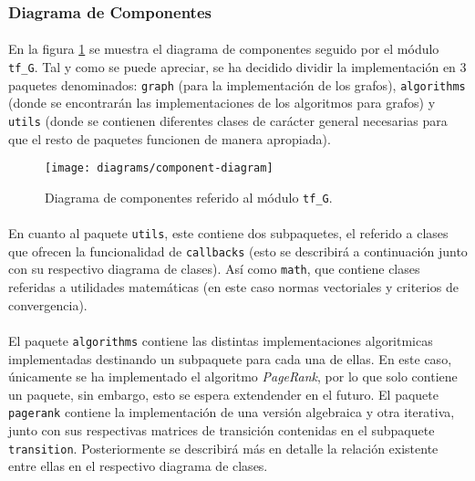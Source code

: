 \documentclass{subfiles}
\begin{document}
        \subsubsection{Diagrama de Componentes}
        \label{sec:component_diagram}

          \paragraph{}
          En la figura \ref{img:component_diagram} se muestra el diagrama de componentes seguido por el módulo \texttt{tf\_G}. Tal y como se puede apreciar, se ha decidido dividir la implementación en 3 paquetes denominados: \texttt{graph} (para la implementación de los grafos), \texttt{algorithms} (donde se encontrarán las implementaciones de los algoritmos para grafos) y \texttt{utils} (donde se contienen diferentes clases de carácter general necesarias para que el resto de paquetes funcionen de manera apropiada).

          \begin{figure}[h]
            \centering
            \texttt{[image: diagrams/component-diagram]}
            \caption{Diagrama de componentes referido al módulo \texttt{tf\_G}.}
            \label{img:component_diagram}
          \end{figure}

          \paragraph{}
          En cuanto al paquete \texttt{utils}, este contiene dos subpaquetes, el referido a clases que ofrecen la funcionalidad de \texttt{callbacks} (esto se describirá a continuación junto con su respectivo diagrama de clases). Así como \texttt{math}, que contiene clases referidas a utilidades matemáticas (en este caso normas vectoriales y criterios de convergencia).

          \paragraph{}
          El paquete \texttt{algorithms} contiene las distintas implementaciones algoritmicas implementadas destinando un subpaquete para cada una de ellas. En este caso, únicamente se ha implementado el algoritmo \emph{PageRank}, por lo que solo contiene un paquete, sin embargo, esto se espera extendender en el futuro. El paquete \texttt{pagerank} contiene la implementación de una versión algebraica y otra iterativa, junto con sus respectivas matrices de transición contenidas en el subpaquete \texttt{transition}. Posteriormente se describirá más en detalle la relación existente entre ellas en el respectivo diagrama de clases.
\end{document}
